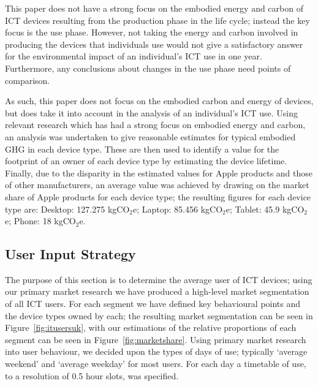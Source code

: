 \documentclass[conference]{IEEEtran}
\begin{document}
This paper does not have a strong focus on the embodied energy and
carbon of ICT devices resulting from the production phase in the life
cycle; instead the key focus is the use phase. However, not taking the
energy and carbon involved in producing the devices that individuals
use would not give a satisfactory answer for the environmental impact
of an individual's ICT use in one year. Furthermore, any conclusions
about changes in the use phase need points of comparison.

As such, this paper does not focus on the
embodied carbon and energy of devices, but does take it into account
in the analysis of an individual's ICT use. Using relevant
research which has had a strong focus on embodied energy and carbon,
an analysis was undertaken to give reasonable estimates for typical
embodied GHG in each device type. These are then used to identify a
value for the footprint of an owner of each device type by estimating
the device lifetime. Finally, due to the disparity in the estimated
values for Apple products and those of other manufacturers, an average
value was achieved by drawing on the market share of Apple products
for each device type; the resulting figures for each device type
are: Desktop: 127.275 kgCO$_2$e; Laptop: 85.456 kgCO$_2$e; Tablet:
45.9 kgCO$_2$e; Phone: 18 kgCO$_2$e.

\subsection{User Input Strategy}

The purpose of this section is to determine the average user of ICT
devices; using our primary market research we have produced a
high-level market segmentation of all ICT users. For each segment we
have defined key behavioural points and the device types owned by
each; the resulting market segmentation can be seen in
Figure~\ref{fig:itusersuk}, with our estimations of the relative
proportions of each segment can be seen in
Figure~\ref{fig:marketshare}.  Using primary market research into user
behaviour, we decided upon the types of days of use; typically
`average weekend' and `average weekday' for most users. For each day a
timetable of use, to a resolution of 0.5 hour slots, was specified.
\end{document}
